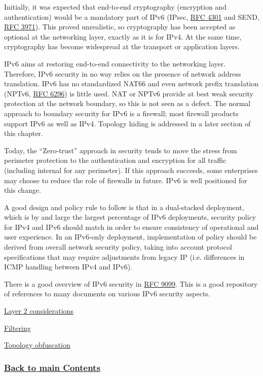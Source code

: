 \documentclass[
]{article}
\begin{document}
Initially, it was expected that end-to-end cryptography (encryption and
authentication) would be a mandatory part of IPv6 (IPsec,
\href{https://www.rfc-editor.org/info/rfc4301}{RFC 4301} and SEND,
\href{https://www.rfc-editor.org/info/rfc3971}{RFC 3971}). This proved
unrealistic, so cryptography has been accepted as optional at the
networking layer, exactly as it is for IPv4. At the same time,
cryptography has become widespread at the transport or application
layers.

IPv6 aims at restoring end-to-end connectivity to the networking layer.
Therefore, IPv6 security in no way relies on the presence of network
address translation. IPv6 has no standardized NAT66 and even network
prefix translation (NPTv6,
\href{https://www.rfc-editor.org/info/rfc6296}{RFC 6296}) is little
used. NAT or NPTv6 provide at best weak security protection at the
network boundary, so this is not seen as a defect. The normal approach
to boundary security for IPv6 is a firewall; most firewall products
support IPv6 as well as IPv4. Topology hiding is addressed in a later
section of this chapter.

Today, the ``Zero-trust'' approach in security tends to move the stress
from perimeter protection to the authentication and encryption for all
traffic (including internal for any perimeter). If this approach
succeeds, some enterprises may choose to reduce the role of firewalls in
future. IPv6 is well positioned for this change.

A good design and policy rule to follow is that in a dual-stacked
deployment, which is by and large the largest percentage of IPv6
deployments, security policy for IPv4 and IPv6 should match in order to
ensure consistency of operational and user experience. In an IPv6-only
deployment, implementation of policy should be derived from overall
network security policy, taking into account protocol specifications
that may require adjustments from legacy IP (i.e. differences in ICMP
handling between IPv4 and IPv6).

There is a good overview of IPv6 security in
\href{https://www.rfc-editor.org/info/rfc9099}{RFC 9099}. This is a good
repository of references to many documents on various IPv6 security
aspects.

\hyperref[layer-2-considerations]{Layer 2 considerations}

\hyperref[filtering]{Filtering}

\hyperref[topology-obfuscation]{Topology obfuscation}

\subsubsection{\texorpdfstring{\hyperref[list-of-contents]{Back to main
Contents}}{Back to main Contents}}\label{back-to-main-contents-3}
\end{document}
